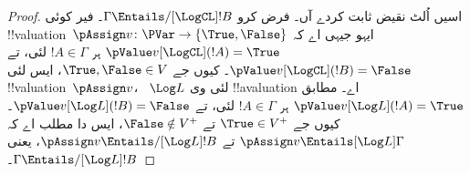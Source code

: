 \documentclass[../../../include/open-logic-section]{subfiles}
\begin{document}
\begin{proof}
  اسیں اُلٹ نقیض ثابت کردے آں۔ فرض کرو $\Gamma \Entails/[\LogCL] !B$۔
  فیر کوئی !!{valuation}~$\pAssign v\colon \PVar \to
  \{\True, \False\}$ ایہو جیہی اے کہ $\pValue v[\LogCL](!A) = \True$
  ہر $!A \in \Gamma$ لئی، تے $\pValue v[\LogCL](!B) = \False$۔
  کیوں جے $\True,
  \False \in V$، ایس لئی !!{valuation}~$\pAssign v$،
  ~$\Log L$ لئی وی !!a{valuation} اے۔ 
  مطابق $\pValue v[\Log L](!A) =
  \True$ ہر $!A \in \Gamma$ لئی، تے $\pValue v[\Log L](!B) = \False$۔
  کیوں جے $\True \in V^+$ تے $\False \notin V^+$، ایس دا
  مطلب اے کہ $\pAssign v
  \Entails[\Log L] \Gamma$ تے $\pAssign v \Entails/[\Log L] !B$،
  یعنی $\Gamma \Entails/[\Log L] !B$۔
\end{proof}
\end{document}

